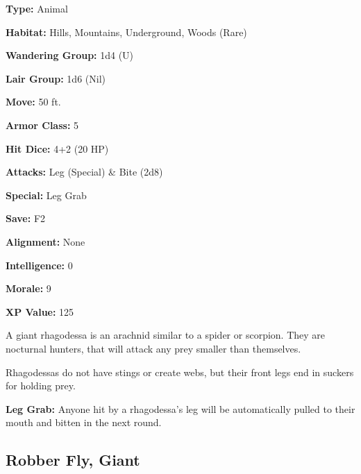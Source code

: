 \begin{multicols*}{2}
{\textbf{Type:} Animal

\textbf{Habitat:} Hills, Mountains, Underground, Woods (Rare)

\textbf{Wandering Group:} 1d4 (U)

\textbf{Lair Group:} 1d6 (Nil)

\textbf{Move:} 50 ft.

\textbf{Armor Class:} 5

\textbf{Hit Dice:} 4+2 (20 HP)

\textbf{Attacks:} Leg (Special) \& Bite (2d8)

\textbf{Special:} Leg Grab

\textbf{Save:} F2

\textbf{Alignment:} None

\textbf{Intelligence:} 0

\textbf{Morale:} 9

\textbf{XP Value:} 125}

A giant rhagodessa is an arachnid similar to a spider or scorpion. They are nocturnal hunters, that will attack any prey smaller than themselves.

Rhagodessas do not have stings or create webs, but their front legs end in suckers for holding prey.

\textbf{Leg Grab:} Anyone hit by a rhagodessa's leg will be automatically pulled to their mouth and bitten in the next round.

\subsection{Robber Fly, Giant}
\end{multicols*}
